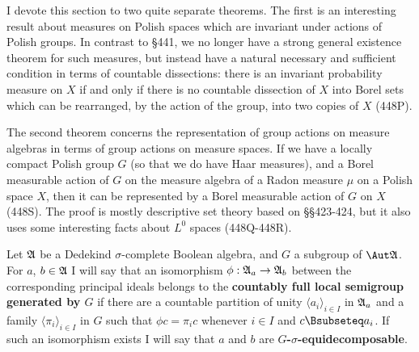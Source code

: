 
\def\Gse{$G$-\vthsp$\sigma$-\vthsp equidecomposable}
\def\IMPLY#1#2{{\bf (#1)$\Rightarrow$(#2)}}
\def\psG{\preccurlyeq^{\sigma}_G}
\def\psH{\preccurlyeq^{\sigma}_H}
\def\pstildeG{\preccurlyeq^{\sigma}_{\tilde G}}
\def\ptG{\preccurlyeq^{\tau}_G}
\def\low#1{\lfloor#1\rfloor}
\def\high#1{\lceil#1\rceil}

\def\chaptername{Topological groups}
\def\sectionname{Polish group actions}


I devote this section to two quite separate theorems.   The first is
an interesting result about measures on
Polish spaces which are invariant under actions of Polish groups.   In
contrast to \S441, we no longer have a strong general
existence theorem for such measures, but instead have a natural
necessary and sufficient condition in terms of countable dissections:
there is an invariant probability measure on $X$ if and only if there is no
countable dissection of $X$ into Borel sets which can be rearranged, by
the action of the group, into two copies of $X$ (448P).


The second theorem concerns the representation of group actions on measure
algebras in terms of group actions on measure spaces.   If we have a
locally compact Polish group $G$ (so that we do have Haar measures), and
a Borel measurable action of $G$ on the measure algebra of a Radon measure
$\mu$ on a Polish space $X$, then it can be represented by a Borel
measurable action of $G$ on $X$ (448S).   The proof is mostly descriptive
set theory based on \S\S423-424, but it also uses some interesting facts
about $L^0$ spaces (448Q-448R).

   Let $\frak A$ be a
Dedekind $\sigma$-complete Boolean algebra, and $G$ a subgroup of
$\Aut\frak A$.   For $a$, $b\in\frak A$ I will say that an isomorphism
$\phi:\frak A_a\to\frak A_b$ between the corresponding principal ideals
belongs to the {\bf countably full local semigroup generated by $G$} if
there are a countable partition of unity $\langle a_i\rangle_{i\in I}$
in $\frak A_a$ and a family
$\langle\pi_i\rangle_{i\in I}$ in $G$ such that $\phi c=\pi_ic$
whenever $i\in I$ and $c\Bsubseteq a_i$.   If such an isomorphism exists
I will say that $a$ and $b$ are {\bf \Gse}.

